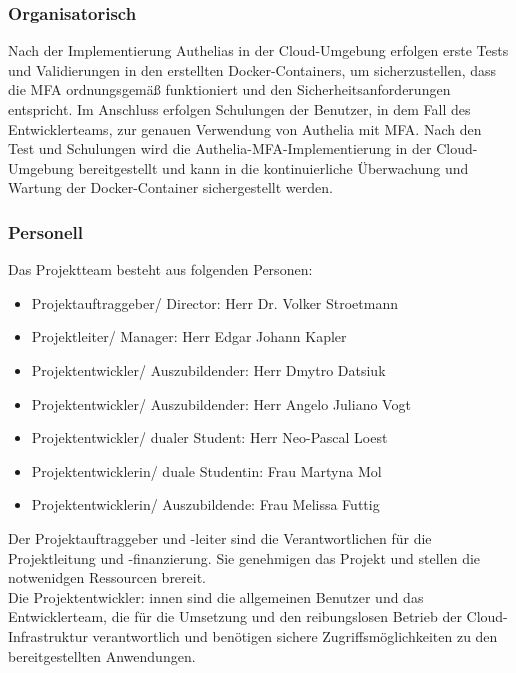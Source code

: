 \subsubsection{Organisatorisch}
\label{sec:Organisatorisch}
Nach der Implementierung Authelias in der Cloud-Umgebung erfolgen erste Tests und Validierungen in den erstellten Docker-Containers, um sicherzustellen, dass die MFA ordnungsgemäß funktioniert und den Sicherheitsanforderungen entspricht. Im Anschluss erfolgen Schulungen der Benutzer, in dem Fall des Entwicklerteams, zur genauen Verwendung von Authelia mit MFA. Nach den Test und Schulungen wird die Authelia-MFA-Implementierung in der Cloud-Umgebung bereitgestellt und kann in die kontinuierliche Überwachung und Wartung der Docker-Container sichergestellt werden.

\subsubsection{Personell}
\label{sec:Personell}
Das Projektteam besteht aus folgenden Personen:
\begin{itemize}
	\item Projektauftraggeber/ Director: Herr Dr. Volker Stroetmann
	\item Projektleiter/ Manager: Herr Edgar Johann Kapler
	\item Projektentwickler/ Auszubildender: Herr Dmytro Datsiuk
	\item Projektentwickler/ Auszubildender: Herr Angelo Juliano Vogt
	\item Projektentwickler/ dualer Student: Herr Neo-Pascal Loest
	\item Projektentwicklerin/ duale Studentin: Frau Martyna Mol
	\item Projektentwicklerin/ Auszubildende: Frau Melissa Futtig
\end{itemize}
Der Projektauftraggeber und -leiter sind die Verantwortlichen für die 
Projektleitung und -finanzierung. Sie genehmigen das Projekt und stellen 
die notwenidgen Ressourcen brereit.
\\Die Projektentwickler: innen sind die allgemeinen Benutzer und das Entwicklerteam, die 
für die Umsetzung und den reibungslosen Betrieb der Cloud-Infrastruktur verantwortlich 
und benötigen sichere Zugriffsmöglichkeiten zu den bereitgestellten Anwendungen.